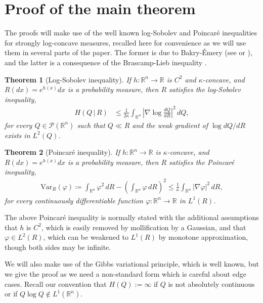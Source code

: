 \documentclass[11pt,reqno]{amsart}
\numberwithin{equation}{section}
\newtheorem{theorem}{Theorem}[section]
\theoremstyle{definition}
\def\R{{\mathbb R}}
\def\P{{\mathcal P}}
\def\Var{{\mathrm{Var}}}
\begin{document}
\section{Proof of the main theorem} \label{se:proof-mainthm}




The proofs will make use of the well known log-Sobolev and Poincar\'e inequalities for strongly log-concave measures, recalled here for convenience as we will use them in several parts of the paper.  The former is due to Bakry-\'Emery (see \cite{bakryemery} or \cite[Corollary 5.7.2]{bakry2013analysis}), and the latter is a consequence of the Brascamp-Lieb inequality \cite[Theorem 4.1]{brascamp2002extensions}.

\begin{theorem}[Log-Sobolev inequality] \label{th:logsobolev}
	If $h : \R^n \to \R$ is $C^2$ and $\kappa$-concave, and $R(dx)=e^{h(x)}dx$ is a probability measure,  then $R$ satisfies the log-Sobolev inequality,
	\begin{align*}
		H(Q\,|\,R) &\le \frac{1}{2\kappa}\int_{\R^n} \left|\nabla \log\frac{dQ}{dR}\right|^2\,dQ,
	\end{align*}
	for every $Q \in \P(\R^n)$ such that $Q \ll R$ and the weak gradient of $\log dQ/dR$ exists in $L^2(Q)$.
\end{theorem}


\begin{theorem}[Poincar\'e inequality] \label{th:poincare}
	If $h : \R^n \to \R$ is $\kappa$-concave, and $R(dx)=e^{h(x)}dx$ is a probability measure,  then $R$ satisfies the Poincar\'e inequality,
		\begin{align*}
		\Var_R(\varphi) \coloneqq \int_{\R^n} \varphi^2 \, dR- \left(\int_{\R^n} \varphi \, dR\right)^2 \le \frac{1}{\kappa} \int_{\R^n} |\nabla \varphi|^2 \, dR,
	\end{align*}
	for every continuously differentiable function $\varphi : \R^n \to \R$ in $L^1(R)$.
\end{theorem}

The above Poincar\'e inequality is normally stated with the additional assumptions that $h$ is $C^2$, which is easily removed by mollification by a Gaussian, and that $\varphi \in L^2(R)$, which can be weakened to $L^1(R)$ by monotone approximation, though both sides may be infinite.

We will also make use of the Gibbs variational principle, which is well known, but we give the proof as we need a non-standard form which is careful about edge cases. Recall our convention that $H(Q) :=\infty$ if $Q$ is not absolutely continuous or if $Q\log Q \notin L^1(\R^n)$.
\end{document}
